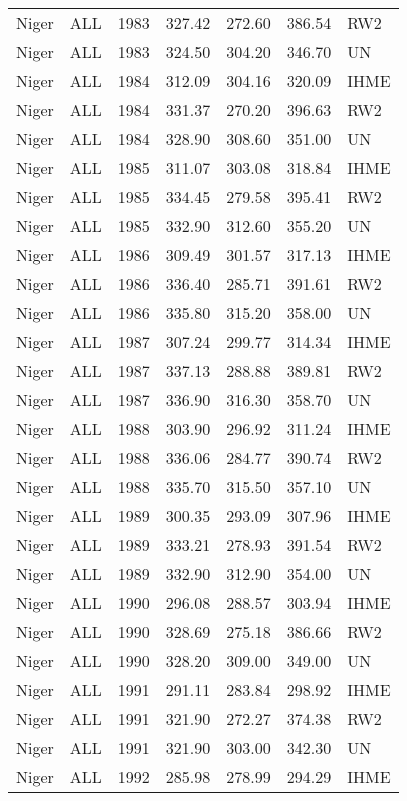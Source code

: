 \begin{longtable}{lllrrrl}
  Niger & ALL & 1983 & 327.42 & 272.60 & 386.54 & RW2 \\ 
  Niger & ALL & 1983 & 324.50 & 304.20 & 346.70 & UN \\ 
  Niger & ALL & 1984 & 312.09 & 304.16 & 320.09 & IHME \\ 
  Niger & ALL & 1984 & 331.37 & 270.20 & 396.63 & RW2 \\ 
  Niger & ALL & 1984 & 328.90 & 308.60 & 351.00 & UN \\ 
  Niger & ALL & 1985 & 311.07 & 303.08 & 318.84 & IHME \\ 
  Niger & ALL & 1985 & 334.45 & 279.58 & 395.41 & RW2 \\ 
  Niger & ALL & 1985 & 332.90 & 312.60 & 355.20 & UN \\ 
  Niger & ALL & 1986 & 309.49 & 301.57 & 317.13 & IHME \\ 
  Niger & ALL & 1986 & 336.40 & 285.71 & 391.61 & RW2 \\ 
  Niger & ALL & 1986 & 335.80 & 315.20 & 358.00 & UN \\ 
  Niger & ALL & 1987 & 307.24 & 299.77 & 314.34 & IHME \\ 
  Niger & ALL & 1987 & 337.13 & 288.88 & 389.81 & RW2 \\ 
  Niger & ALL & 1987 & 336.90 & 316.30 & 358.70 & UN \\ 
  Niger & ALL & 1988 & 303.90 & 296.92 & 311.24 & IHME \\ 
  Niger & ALL & 1988 & 336.06 & 284.77 & 390.74 & RW2 \\ 
  Niger & ALL & 1988 & 335.70 & 315.50 & 357.10 & UN \\ 
  Niger & ALL & 1989 & 300.35 & 293.09 & 307.96 & IHME \\ 
  Niger & ALL & 1989 & 333.21 & 278.93 & 391.54 & RW2 \\ 
  Niger & ALL & 1989 & 332.90 & 312.90 & 354.00 & UN \\ 
  Niger & ALL & 1990 & 296.08 & 288.57 & 303.94 & IHME \\ 
  Niger & ALL & 1990 & 328.69 & 275.18 & 386.66 & RW2 \\ 
  Niger & ALL & 1990 & 328.20 & 309.00 & 349.00 & UN \\ 
  Niger & ALL & 1991 & 291.11 & 283.84 & 298.92 & IHME \\ 
  Niger & ALL & 1991 & 321.90 & 272.27 & 374.38 & RW2 \\ 
  Niger & ALL & 1991 & 321.90 & 303.00 & 342.30 & UN \\ 
  Niger & ALL & 1992 & 285.98 & 278.99 & 294.29 & IHME \\ 

\end{longtable}
